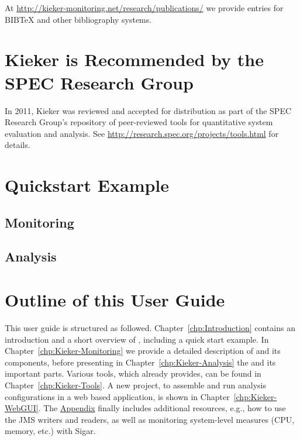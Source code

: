 		\noindent At \url{http://kieker-monitoring.net/research/publications/} we provide entries for $\mathrm{B\scriptstyle IB}\!$\TeX{} and other bibliography systems.

	\section{Kieker is Recommended by the SPEC Research Group}
		In 2011, Kieker was reviewed and accepted for distribution as part of the SPEC Research Group's repository of peer-reviewed tools for quantitative system evaluation and analysis. See \url{http://research.spec.org/projects/tools.html} for details.
	
	\section{Quickstart Example}\label{sec:ch1:Quickstart}
		\subsection{Monitoring}
		\subsection{Analysis}
		
	\section{Outline of this User Guide}
		This user guide is structured as followed. Chapter~\ref{chp:Introduction} contains an introduction and a short overview of \Kieker{}, including a quick start example. In Chapter~\ref{chp:Kieker-Monitoring} we provide a detailed description of \KiekerMonitoringPart{} and its components, before presenting in Chapter~\ref{chp:Kieker-Analysis} the \KiekerAnalysisPart{} and its important parts. Various tools, which \Kieker{} already provides, can be found in Chapter~\ref{chp:Kieker-Tools}. A new project, to assemble and run analysis configurations in a web based application, is shown in Chapter~\ref{chp:Kieker-WebGUI}. The \hyperlink{hypertarget:appendix}{Appendix} finally includes additional resources, e.g., how to use the JMS writers and readers, as well as monitoring system-level measures (CPU, memory, etc.) with Sigar. 

		\vspace{1cm}

